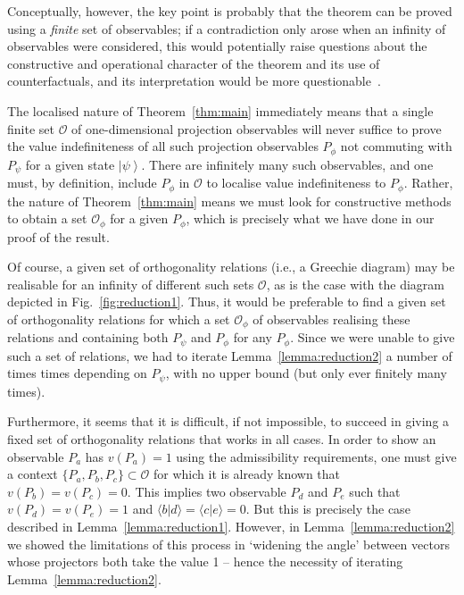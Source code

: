 \documentclass[%
 superscriptaddress,
 preprint,
 showpacs,
 showkeys,
 nofootinbib,
  amsmath,amssymb,
  aps,
  longbibliography,
  floatfix,
 ]{revtex4-1}
\theoremstyle{definition}
\newcommand{\ket}[1]{\left| #1 \right>}
\newcommand{\iprod}[2]{\langle #1 | #2 \rangle}
\begin{document}
Conceptually, however, the key point is probably that the theorem can be proved using a \emph{finite} set of observables;
if a contradiction only arose when an infinity of observables were considered, this would potentially raise questions about the
{\color{blue} constructive and operational character} of the theorem and its use of counterfactuals, and its interpretation would be more questionable~\cite{Pitowsky:1998aa}.

The localised nature of Theorem~\ref{thm:main} immediately means that a single finite set $\mathcal{O}$ of {\color{blue}one-dimensional projection} observables will never suffice to prove the value indefiniteness of all {\color{blue} such projection} observables $P_\phi$ not commuting with $P_\psi$ for a given state $\ket{\psi}$.
There are infinitely many such observables, and one must, by definition, include $P_\phi$ in $\mathcal{O}$ to localise value indefiniteness to $P_\phi$.
Rather, the nature of Theorem~\ref{thm:main} means we must look for constructive methods to obtain a set $\mathcal{O}_\phi$ for a given $P_\phi$, which is precisely what we have done in our proof of the result.

Of course, a given set of orthogonality relations (i.e., a Greechie diagram) may be realisable for an infinity of different {\color{blue}such} sets $\mathcal{O}$, as is the case with the diagram depicted in Fig.~\ref{fig:reduction1}.
Thus, it would be preferable to find a given set of orthogonality relations for which a set $\mathcal{O}_\phi$ of observables realising these relations and containing both $P_\psi$ and $P_\phi$ for any $P_\phi$.
Since we were unable to give such a set of relations, we had to iterate Lemma~\ref{lemma:reduction2} a number of times times depending on $P_\psi$, with no upper bound (but only ever finitely many times).

Furthermore, it seems that it is difficult, if not impossible, to succeed in giving a fixed set of orthogonality relations that works in all cases.
In order to show an observable $P_a$ has $v(P_a)=1$ using the admissibility requirements, one must give a context $\{P_a,P_b,P_c\}\subset \mathcal{O}$ for which it is already known that $v(P_b)=v(P_c)=0$.
This implies two observable $P_d$ and $P_e$ such that $v(P_d)=v(P_e)=1$ and $\iprod{b}{d}=\iprod{c}{e}=0$.
But this is precisely the case described in Lemma~\ref{lemma:reduction1}.
However, in Lemma~\ref{lemma:reduction2} we showed the limitations of this process in `widening the angle' between vectors whose projectors both take the value 1 -- hence the necessity of iterating Lemma~\ref{lemma:reduction2}.
\end{document}
